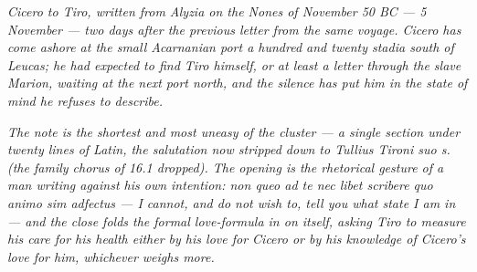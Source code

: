 
\textit{Cicero to Tiro, written from Alyzia on the
Nones of November 50 BC --- 5 November --- two days
after the previous letter from the same voyage. Cicero
has come ashore at the small Acarnanian port a hundred
and twenty stadia south of Leucas; he had expected to
find Tiro himself, or at least a letter through the
slave Marion, waiting at the next port north, and the
silence has put him in the state of mind he refuses to
describe.}

\textit{The note is the shortest and most uneasy of the
cluster --- a single section under twenty lines of Latin,
the salutation now stripped down to \textit{Tullius
Tironi suo s.} (the family chorus of 16.1 dropped). The
opening is the rhetorical gesture of a man writing
against his own intention: \textit{non queo ad te nec
libet scribere quo animo sim adfectus} --- I cannot,
and do not wish to, tell you what state I am in --- and
the close folds the formal love-formula in on itself,
asking Tiro to measure his care for his health either by
his love for Cicero or by his knowledge of Cicero's love
for him, whichever weighs more.}
